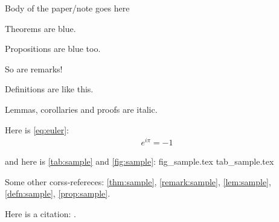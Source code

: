 Body of the paper/note goes here

\begin{thm}\label{thm:sample}
	Theorems are blue.
\end{thm}

\begin{prop}\label{prop:sample}
	Propositions are blue too.
\end{prop}

\begin{remark}\label{remark:sample}
	So are remarks!
\end{remark}

\begin{defn}\label{defn:sample}
	Definitions are like this.
\end{defn}

\begin{lem}\label{lem:sample}
	Lemmas, corollaries and proofs are italic.
\end{lem}

Here is \cref{eq:euler}:
\begin{align}\label{eq:euler}
	e^{i\pi} = -1 
\end{align}

and here is \cref{tab:sample} and \cref{fig:sample}:
{fig_sample.tex}
{tab_sample.tex}

Some other corss-refereces:
\cref{thm:sample},
\cref{remark:sample},
\cref{lem:sample},
\cref{defn:sample},
\cref{prop:sample}.

Here is a citation: \cite{afrouzi2016dynamic}.